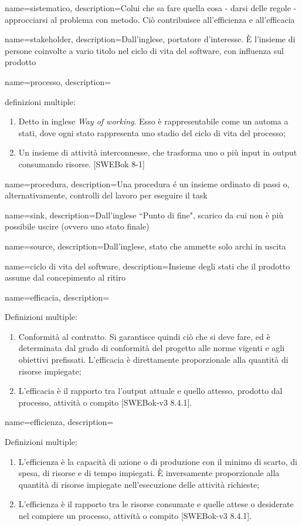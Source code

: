 {
name=sistematico,
description={Colui che sa fare quella cosa - darsi delle regole - approcciarsi al problema con metodo. Ci\`o contribuisce all'efficienza e all'efficacia}
}

{
name=stakeholder,
description={Dall'inglese, portatore d'interesse. È l'insieme di persone coinvolte a vario titolo nel ciclo di vita del software, con influenza sul prodotto}
}

{
name=processo, 
description={definizioni multiple:
\begin{enumerate}
\item Detto in inglese \textit{Way of working}. Esso \`e rappresentabile come un automa a stati, dove ogni stato rappresenta uno stadio del ciclo di vita del processo;
\item Un insieme di attività interconnesse, che trasforma uno o più input in output consumando risorse. [SWEBok 8-1]
\end{enumerate}
}
}

{
name=procedura,
description={Una procedura \'e un insieme ordinato di passi o, alternativamente, controlli del lavoro per eseguire il task}
}


{
name=sink,
description={Dall'inglese ``Punto di fine", scarico da cui non è più possibile uscire (ovvero uno stato finale)}
}

{
name=source,
description={Dall'inglese, stato che ammette solo archi in uscita}
}

{
name=ciclo di vita del software,
description={Insieme degli stati che il prodotto assume dal concepimento al ritiro}
}

{
name=efficacia,
description={Definizioni multiple:
\begin{enumerate}
\item Conformit\`a al contratto. Si garantisce quindi ci\`o che si deve fare, ed \`e determinata dal grado di conformit\`a del progetto alle norme vigenti e agli obiettivi prefissati. L'efficacia \`e direttamente proporzionale alla quantit\`a di risorse impiegate;
\item L'efficacia \`e il rapporto tra l'output attuale e quello attesso, prodotto dal processo, attivit\`a o compito [SWEBok-v3 8.4.1].
\end{enumerate}
}
}

{
name=efficienza,
description={Definizioni multiple: 
\begin{enumerate}
\item L'efficienza \`e la capacit\`a di azione o di produzione con il minimo di scarto, di spesa, di risorse e di tempo impiegati. \`E inversamente proporzionale alla quantit\`a di risorse impiegate nell'esecuzione delle attivit\`a richieste;
\item L'efficienza \`e il rapporto tra le risorse consumate e quelle attese o desiderate nel compiere un processo, attivit\`a o compito [SWEBok-v3 8.4.1].
\end{enumerate}
}
}


